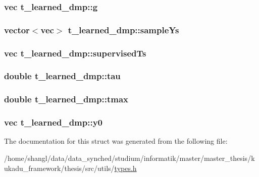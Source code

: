 \hypertarget{structt__learned__dmp_a90c4955fe578eeb96f2832494fe7a362}{
\subsubsection[{g}]{\setlength{\rightskip}{0pt plus 5cm}vec {\bf t\-\_\-learned\-\_\-dmp\-::g}}}\label{structt__learned__dmp_a90c4955fe578eeb96f2832494fe7a362}
\hypertarget{structt__learned__dmp_a617a640048f690d6b713a63b0d379685}{
\subsubsection[{sample\-Ys}]{\setlength{\rightskip}{0pt plus 5cm}vector$<$vec$>$ {\bf t\-\_\-learned\-\_\-dmp\-::sample\-Ys}}}\label{structt__learned__dmp_a617a640048f690d6b713a63b0d379685}
\hypertarget{structt__learned__dmp_a4d705a7f8b60ac3012e4ba223cab42ef}{
\subsubsection[{supervised\-Ts}]{\setlength{\rightskip}{0pt plus 5cm}vec {\bf t\-\_\-learned\-\_\-dmp\-::supervised\-Ts}}}\label{structt__learned__dmp_a4d705a7f8b60ac3012e4ba223cab42ef}
\hypertarget{structt__learned__dmp_a0c81fa28d11df6e40b894496fddcb2a9}{
\subsubsection[{tau}]{\setlength{\rightskip}{0pt plus 5cm}double {\bf t\-\_\-learned\-\_\-dmp\-::tau}}}\label{structt__learned__dmp_a0c81fa28d11df6e40b894496fddcb2a9}
\hypertarget{structt__learned__dmp_a31eb510344d4370e28562076d9b7d532}{
\subsubsection[{tmax}]{\setlength{\rightskip}{0pt plus 5cm}double {\bf t\-\_\-learned\-\_\-dmp\-::tmax}}}\label{structt__learned__dmp_a31eb510344d4370e28562076d9b7d532}
\hypertarget{structt__learned__dmp_a918c713e63cd441d7764bb4757194aa7}{
\subsubsection[{y0}]{\setlength{\rightskip}{0pt plus 5cm}vec {\bf t\-\_\-learned\-\_\-dmp\-::y0}}}\label{structt__learned__dmp_a918c713e63cd441d7764bb4757194aa7}


\-The documentation for this struct was generated from the following file\-:\begin{DoxyCompactItemize}
\item 
/home/shangl/data/data\-\_\-synched/studium/informatik/master/master\-\_\-thesis/kukadu\-\_\-framework/thesis/src/utils/\hyperlink{types_8h}{types.\-h}\end{DoxyCompactItemize}
